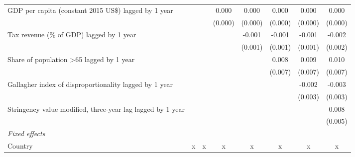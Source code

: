\begin{tabular}{lccccccc}
   GDP per capita (constant 2015 US\$) lagged by 1 year                                    &              &              & 0.000        & 0.000        & 0.000        & 0.000        & 0.000\\   
                                                                                           &              &              & (0.000)      & (0.000)      & (0.000)      & (0.000)      & (0.000)\\   
   Tax revenue (\% of GDP) lagged by 1 year                                                &              &              &              & -0.001       & -0.001       & -0.001       & -0.002\\   
                                                                                           &              &              &              & (0.001)      & (0.001)      & (0.001)      & (0.002)\\   
   Share of population >65 lagged by 1 year                                                &              &              &              &              & 0.008        & 0.009        & 0.010\\   
                                                                                           &              &              &              &              & (0.007)      & (0.007)      & (0.007)\\   
   Gallagher index of disproportionality lagged by 1 year                                  &              &              &              &              &              & -0.002       & -0.003\\   
                                                                                           &              &              &              &              &              & (0.003)      & (0.003)\\   
   Stringency value modified, three-year lag lagged by 1 year                              &              &              &              &              &              &              & 0.008\\   
                                                                                           &              &              &              &              &              &              & (0.005)\\   
   \emph{Fixed effects}\\
   Country                                                                                 & x            & x            & x            & x            & x            & x            & x\\  

\end{tabular}
